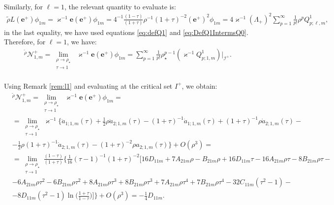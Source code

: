 \\
Similarly, for $\ell=1$, the relevant quantity to evaluate is:
\begin{align}
  \tilde{\rho} L (\boldsymbol{e}^{+}) \phi_{1m}= \varkappa^{-1}\boldsymbol{e} (\boldsymbol{e}^{+})\phi_{1m} = 4^{-1}\frac{(1-\tau)}{(1+\tau)}\rho^{-1}(1+\tau)^{-2}(\boldsymbol{e}^{+})^2\phi_{1m} = 4\varkappa^{-1}(\Lambda_{+})^{2}\sum_{p=1}^{\infty}\frac{1}{p!}\rho^pQ^{1}_{p;\ell,m},
\end{align}
in the last equality, we have used equations \eqref{eq:defQ1} and \eqref{eq:DefQ1IntermsQ0}. Therefore, for $\ell=1$, we have:
\begin{align}
  \mathcal{}^{\tilde{\rho}}\mathcal{N}^{+}_{1,m} = \lim_{\substack{\rho \to \rho_{\star} \\ \tau \to 1}} \; \varkappa^{-1}\boldsymbol{e} (\boldsymbol{e}^{+}) \phi_{1m} = \sum_{p=1}^{\infty}\frac{1}{p!}\rho_{\star}^{p-1}(\varkappa^{-1}Q^{1}_{p;1,m})|_{\mathscr{I}^{+}}.
\end{align}
\\
Using Remark \ref{rem:l1} and evaluating at the critical set $I^{+}$, we obtain:
\begin{align}
  & \mathcal{}^{\tilde{\rho}}\mathcal{N}^{+}_{1,m} = \lim_{\substack{\rho \to \rho_{\star} \\ \tau \to 1}} \; \varkappa^{-1}\boldsymbol{e} (\boldsymbol{e}^{+}) \phi_{1m} = \nonumber \\
  & = \lim_{\substack{\rho \to \rho_{\star} \\ \tau \to 1}} \varkappa^{-1}\biggl\{\ddot{a}_{1;1,m}(\tau)+\frac{1}{2}\rho \ddot{a}_{2;1,m}(\tau) - (1+\tau)^{-1}\dot{a}_{1;1,m}(\tau)+(1+\tau)^{-1}\rho \dot{a}_{2;1,m}(\tau)- \nonumber \\
  & - \frac{1}{2}\rho(1+\tau)^{-1}\dot{a}_{2;1,m}(\tau)-(1+\tau)^{-2}\rho a_{2;1,m}(\tau)\biggr\} + O(\rho^{3}) = \nonumber \\
  & = \lim_{\substack{\rho \to \rho_{\star} \\ \tau \to 1}} \frac{(1-\tau)}{(1+\tau)} \biggl\{\frac{1}{16}(\tau-1)^{-1}(1+\tau)^{-2}\bigl[16D_{11m}+7A_{21m}\rho - B_{21m}\rho + 16D_{11m}\tau - 16A_{21m}\rho\tau - 8B_{21m}\rho\tau - \nonumber \\
  & - 6A_{21m}\rho\tau^{2} - 6B_{21m}\rho\tau^{2} + 8A_{21m}\rho\tau^{3} + 8B_{21m}\rho\tau^{3} + 7A_{21m}\rho\tau^{4} + 7B_{21m}\rho\tau^{4} - 32C_{11m}(\tau^{2}-1) - \nonumber \\
  & - 8D_{11m}(\tau^{2}-1)\ln\Biggl(\frac{1+\tau}{1-\tau}\Biggr)\bigr]\biggr\} + O(\rho^{3}) = - \frac{1}{4}D_{11m}.
\end{align}
